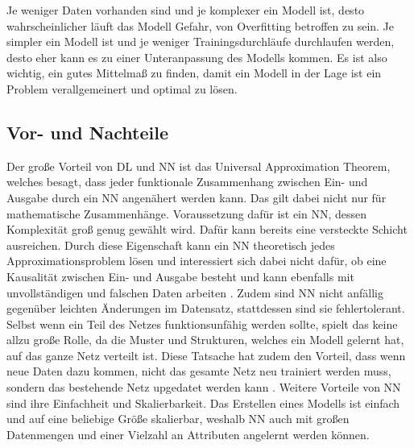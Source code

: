 Je weniger Daten vorhanden sind und je komplexer ein Modell ist, desto wahrscheinlicher läuft das Modell Gefahr, von Overfitting betroffen zu sein. Je simpler ein Modell ist und je weniger
Trainingsdurchläufe durchlaufen werden, desto eher kann es zu einer Unteranpassung des Modells kommen. Es ist also wichtig, ein gutes Mittelmaß zu finden, damit ein Modell in der Lage ist
ein Problem verallgemeinert und optimal zu lösen.

\subsection{Vor- und Nachteile}
Der große Vorteil von \ac{DL} und \ac{NN} ist das \glqq Universal Approximation Theorem\grqq{}, welches besagt, dass jeder funktionale Zusammenhang zwischen Ein- und Ausgabe
durch ein \ac{NN} angenähert werden kann. Das gilt dabei nicht nur für mathematische Zusammenhänge. Voraussetzung dafür ist ein \ac{NN}, dessen Komplexität groß genug gewählt wird. 
Dafür kann bereits eine versteckte Schicht ausreichen. Durch diese Eigenschaft kann ein \ac{NN} theoretisch jedes Approximationsproblem lösen und interessiert sich dabei nicht dafür, 
ob eine Kausalität zwischen Ein- und Ausgabe besteht und kann ebenfalls mit unvollständigen und falschen Daten arbeiten \cite[vgl. S.74ff.]{NN}. Zudem sind \ac{NN} nicht anfällig 
gegenüber leichten Änderungen im Datensatz, stattdessen sind sie fehlertolerant. Selbst wenn ein Teil des Netzes funktionsunfähig werden sollte, spielt das keine allzu große Rolle,
da die Muster und Strukturen, welches ein Modell gelernt hat, auf das ganze Netz verteilt ist. Diese Tatsache hat zudem den Vorteil, dass wenn neue Daten dazu kommen, nicht 
das gesamte Netz neu trainiert werden muss, sondern das bestehende Netz upgedatet werden kann \cite[vgl. S.82]{NN}. Weitere Vorteile von \ac{NN} sind ihre Einfachheit und Skalierbarkeit.
Das Erstellen eines Modells ist einfach und auf eine beliebige Größe skalierbar, weshalb \ac{NN} auch mit großen Datenmengen und einer Vielzahl an Attributen angelernt werden können.



